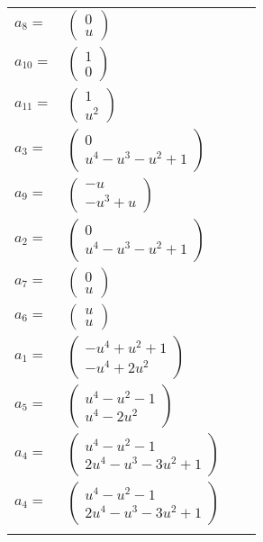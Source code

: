 \documentclass[1p]{elsarticle_modified}
\theoremstyle{definition}
\begin{document}
\begin{tabular}{m{7pt} m{180pt} m{7pt} m{180pt} }
\flushright $a_{8}=$&$\begin{pmatrix}0\\u\end{pmatrix}$ \\
\flushright $a_{10}=$&$\begin{pmatrix}1\\0\end{pmatrix}$ \\
\flushright $a_{11}=$&$\begin{pmatrix}1\\u^2\end{pmatrix}$ \\
\flushright $a_{3}=$&$\begin{pmatrix}0\\u^4- u^3- u^2+1\end{pmatrix}$ \\
\flushright $a_{9}=$&$\begin{pmatrix}- u\\- u^3+u\end{pmatrix}$ \\
\flushright $a_{2}=$&$\begin{pmatrix}0\\u^4- u^3- u^2+1\end{pmatrix}$ \\
\flushright $a_{7}=$&$\begin{pmatrix}0\\u\end{pmatrix}$ \\
\flushright $a_{6}=$&$\begin{pmatrix}u\\u\end{pmatrix}$ \\
\flushright $a_{1}=$&$\begin{pmatrix}- u^4+u^2+1\\- u^4+2 u^2\end{pmatrix}$ \\
\flushright $a_{5}=$&$\begin{pmatrix}u^4- u^2-1\\u^4-2 u^2\end{pmatrix}$ \\
\flushright $a_{4}=$&$\begin{pmatrix}u^4- u^2-1\\2 u^4- u^3-3 u^2+1\end{pmatrix}$\\ \flushright $a_{4}=$&$\begin{pmatrix}u^4- u^2-1\\2 u^4- u^3-3 u^2+1\end{pmatrix}$\\&\end{tabular}
\end{document}
